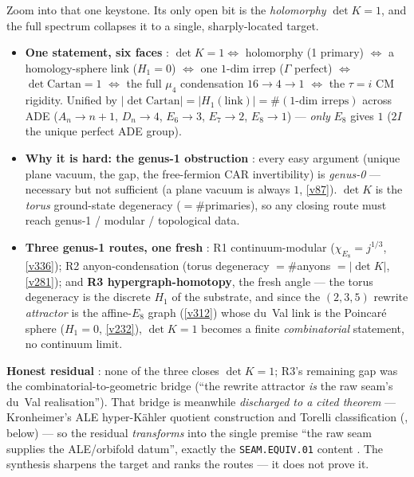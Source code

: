 \begin{keybox}[The one keystone bit $\det K{=}1$: six faces, the genus-1 obstruction, three routes \mE/\mC/\mO\ (\veri{v344\_detk\_synthesis.py})]
Zoom into that one keystone. Its only open bit is the \emph{holomorphy} $\det K{=}1$, and the full spectrum
collapses it to a single, sharply-located target.
\begin{itemize}\setlength\itemsep{1pt}
\item \textbf{One statement, six faces} \mE: $\det K{=}1\Leftrightarrow$ holomorphy (1 primary) $\Leftrightarrow$
a homology-sphere link ($H_1{=}0$) $\Leftrightarrow$ one $1$-dim irrep ($\Gamma$ perfect) $\Leftrightarrow$
$\det\mathrm{Cartan}{=}1$ $\Leftrightarrow$ the full $\mu_4$ condensation $16{\to}4{\to}1$ $\Leftrightarrow$ the
$\tau{=}i$ CM rigidity. Unified by $|\det\mathrm{Cartan}|=|H_1(\text{link})|=\#(\text{1-dim irreps})$ across ADE
($A_n{\to}n{+}1$, $D_n{\to}4$, $E_6{\to}3$, $E_7{\to}2$, $E_8{\to}1$) --- \emph{only} $E_8$ gives $1$ ($2I$ the
unique perfect ADE group).
\item \textbf{Why it is hard: the genus-1 obstruction} \mE: every easy argument (unique plane vacuum, the gap, the
free-fermion CAR invertibility) is \emph{genus-0} --- necessary but not sufficient (a plane vacuum is always $1$,
\vref{v87}). $\det K$ is the \emph{torus} ground-state degeneracy ($=\#$primaries), so any closing route must reach
genus-1 / modular / topological data.
\item \textbf{Three genus-1 routes, one fresh} \mC: R1 continuum-modular ($\chi_{E_8}{=}j^{1/3}$, \vref{v336});
R2 anyon-condensation (torus degeneracy $=\#$anyons $=|\det K|$, \vref{v281}); and \textbf{R3 hypergraph-homotopy},
the fresh angle --- the torus degeneracy is the discrete $H_1$ of the substrate, and since the $(2,3,5)$ rewrite
\emph{attractor} is the affine-$E_8$ graph (\vref{v312}) whose du~Val link is the Poincar\'e sphere ($H_1{=}0$,
\vref{v232}), $\det K{=}1$ becomes a finite \emph{combinatorial} statement, no continuum limit.
\end{itemize}
\textbf{Honest residual} \mO: none of the three closes $\det K{=}1$; R3's remaining gap was the
combinatorial-to-geometric bridge (``the rewrite attractor \emph{is} the raw seam's du~Val realisation'').
That bridge is meanwhile \emph{discharged to a cited theorem} --- Kronheimer's ALE hyper-K\"ahler quotient
construction and Torelli classification (, below) --- so the residual
\emph{transforms} into the single premise ``the raw seam supplies the ALE/orbifold datum'', exactly the
\texttt{SEAM.EQUIV.01} content \mO. The synthesis sharpens the target and ranks the routes --- it does not prove it.
\end{keybox}

